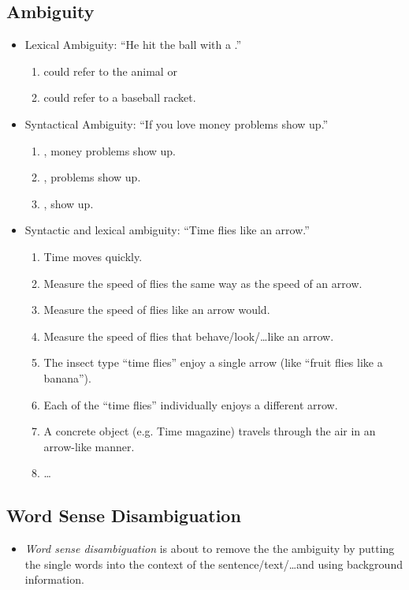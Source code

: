         \subsection{Ambiguity} %
        	\begin{itemize}
        		\item Lexical Ambiguity: \enquote{He hit the ball with a .}
            		\begin{enumerate}
            			\item {} could refer to the animal or
            			\item {} could refer to a baseball racket.
            		\end{enumerate}
        		\item Syntactical Ambiguity: \enquote{If you love money problems show up.}
   					\begin{enumerate}
   						\item {}, money problems show up.
   						\item {}, problems show up.
   						\item {}, show up.
   					\end{enumerate}
        		\item Syntactic and lexical ambiguity: \enquote{Time flies like an arrow.}
   					\begin{enumerate}
   						\item Time moves quickly.
   						\item Measure the speed of flies the same way as the speed of an arrow.
   						\item Measure the speed of flies like an arrow would.
   						\item Measure the speed of flies that behave/look/\dots like an arrow.
   						\item The insect type \enquote{time flies} enjoy a single arrow (like \enquote{fruit flies like a banana}).
   						\item Each of the \enquote{time flies} individually enjoys a different arrow.
   						\item A concrete object (e.g. Time magazine) travels through the air in an arrow-like manner.
   						\item \dots
   					\end{enumerate}
        	\end{itemize}

        \subsection{Word Sense Disambiguation} %
            \begin{itemize}
            	\item \textit{Word sense disambiguation} is about to remove the the ambiguity by putting the single words into the context of the sentence/text/\dots and using background information.
            \end{itemize}

